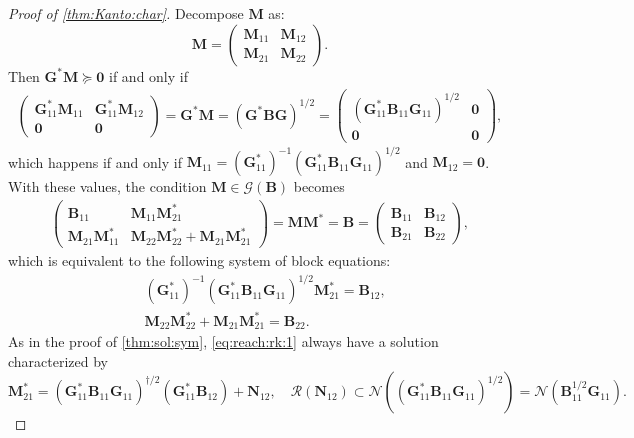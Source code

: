 \documentclass[noinfoline]{imsart}\setcounter{tocdepth}{2}
\newcommand{\m}[1]{\mathbf{#1}} %
\renewcommand{\c}[1]{\mathcal{#1}} %
\theoremstyle{plain}
\begin{document}
\begin{proof}[Proof of \cref{thm:Kanto:char}]
Decompose $\m{M}$ as:
\begin{equation*}
    \m{M} = \begin{pmatrix}
    \m{M}_{11} & \m{M}_{12} \\
    \m{M}_{21} & \m{M}_{22}
    \end{pmatrix}.
\end{equation*}
Then $\m{G}^{*} \m{M} \succeq \m{0}$ if and only if
\begin{align*}
    \begin{pmatrix}
    \m{G}_{11}^{*} \m{M}_{11} & \m{G}_{11}^{*} \m{M}_{12} \\
    \m{0} & \m{0}
    \end{pmatrix} =
    \m{G}^{*} \m{M} = (\m{G}^{*} \m{B} \m{G})^{1/2} = \begin{pmatrix}
    (\m{G}_{11}^{*} \m{B}_{11} \m{G}_{11})^{1/2} & \m{0} \\
    \m{0} & \m{0}
    \end{pmatrix},
\end{align*}
which happens if and only if $\m{M}_{11} = (\m{G}_{11}^{*})^{-1} (\m{G}_{11}^{*} \m{B}_{11} \m{G}_{11})^{1/2}$ and $\m{M}_{12} = \m{0}$. With these values, the condition $\m{M} \in \c{G}(\m{B})$ becomes
\begin{align*}
    \begin{pmatrix}
    \m{B}_{11} & \m{M}_{11} \m{M}_{21}^{*} \\
    \m{M}_{21} \m{M}_{11}^{*} & \m{M}_{22} \m{M}_{22}^{*} + \m{M}_{21} \m{M}_{21}^{*}
    \end{pmatrix} =
    \m{M} \m{M}^{*} = \m{B} = \begin{pmatrix}
    \m{B}_{11} & \m{B}_{12} \\
    \m{B}_{21} & \m{B}_{22}
    \end{pmatrix},
\end{align*}
which is equivalent to the following system of block equations:
\begin{align}
    &(\m{G}_{11}^{*})^{-1} (\m{G}_{11}^{*} \m{B}_{11} \m{G}_{11})^{1/2} \m{M}_{21}^{*} = \m{B}_{12}, \label{eq:reach:rk:1} \\
    &\m{M}_{22} \m{M}_{22}^{*} + \m{M}_{21} \m{M}_{21}^{*} = \m{B}_{22}. \label{eq:reach:rk:2}
\end{align}
As in the proof of \cref{thm:sol:sym},  \eqref{eq:reach:rk:1} always have a solution characterized by
\begin{equation*}
    \m{M}_{21}^{*} = (\m{G}_{11}^{*} \m{B}_{11} \m{G}_{11})^{\dagger/2} (\m{G}_{11}^{*} \m{B}_{12}) + \m{N}_{12}, \quad \c{R}(\m{N}_{12}) \subset \c{N}((\m{G}_{11}^{*} \m{B}_{11} \m{G}_{11})^{1/2}) = \c{N}(\m{B}_{11}^{1/2} \m{G}_{11}).

\end{equation*}
\end{proof}
\end{document}
